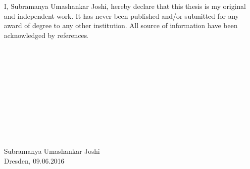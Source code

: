 I, Subramanya Umashankar Joshi, hereby declare that this thesis is my original and independent work. It has never been published and/or submitted for any award of degree to any other institution. All source of information have been acknowledged by references.
\\
\\
\\
\\
\\
\\
\\
\\
\\
\\
\\
\hdashrule{4cm}{1pt}{1pt} \\
Subramanya Umashankar Joshi\\
Dresden, 09.06.2016
